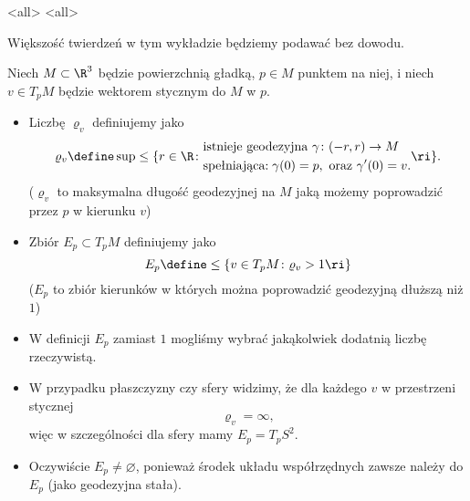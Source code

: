 \mode*
\mode<all>{}
\mode<all>{}

\begin{frame}
Większość twierdzeń w tym wykładzie będziemy podawać bez dowodu.
\begin{definicja}
Niech $M\subset \R^3$ będzie powierzchnią gładką, $p\in M$ punktem na niej, i niech $v\in T_pM$ będzie wektorem stycznym do $M$ w $p$. 
\begin{itemize}
\pause \item Liczbę $\varrho_v$ definiujemy jako
\[\varrho_v\define \sup
\le\{r\in \R\colon \begin{aligned}
&\text{istnieje geodezyjna } \gamma\colon(-r,r)\to M\\
&\text{spełniająca:}\;\gamma(0)=p,\text{ oraz }\gamma'(0)=v.
\end{aligned}\ri\}.\]
\footnotesize ($\varrho_v$ to maksymalna długość geodezyjnej na $M$ jaką możemy poprowadzić przez $p$ w kierunku $v$)\normalsize
\pause \item Zbiór $E_p\subset T_pM$ definiujemy jako
\[E_{p}\define \le\{v\in T_pM\colon \varrho_v>1\ri\}\]
\footnotesize ($E_p $ to zbi\'or kierunk\'ow w kt\'orych można poprowadzić geodezyjną dłuższą niż $1$)\normalsize
\end{itemize}
\end{definicja}
\end{frame}
\begin{frame}[<+->]

\begin{uwaga}
\begin{itemize}
\item W definicji $E_p$ zamiast $1$ mogliśmy wybrać jakąkolwiek dodatnią liczbę rzeczywistą.
\item W przypadku płaszczyzny czy sfery widzimy, że dla każdego $v$ w przestrzeni stycznej \[\varrho_v=\infty,\] więc w szczególności dla sfery mamy $E_p=T_p S^2$.
\item Oczywiście $E_p\neq \varnothing$, ponieważ środek układu współrzędnych zawsze należy do $E_p$ (jako geodezyjna stała).
\end{itemize}

\end{uwaga}

\end{frame}
